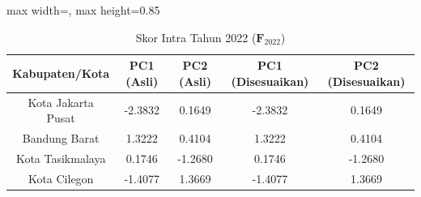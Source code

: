 \begin{table}[H]
\centering
\caption{Skor Intra Tahun 2022 ($\mathbf{F}_{2022}$)} \label{tab:sampleskor_intra_2022}
\begin{adjustbox}{max width=\textwidth, max height=0.85\textheight}
\begin{tabular}{|c|c|c|c|c|}
\hline
\textbf{Kabupaten/Kota} & \textbf{PC1 (Asli)} & \textbf{PC2 (Asli)} & \textbf{PC1 (Disesuaikan)} & \textbf{PC2 (Disesuaikan)} \\
\hline
Kota Jakarta Pusat & -2.3832 & 0.1649 & -2.3832 & 0.1649 \\
Bandung Barat & 1.3222 & 0.4104 & 1.3222 & 0.4104 \\
Kota Tasikmalaya & 0.1746 & -1.2680 & 0.1746 & -1.2680 \\
Kota Cilegon & -1.4077 & 1.3669 & -1.4077 & 1.3669 \\
\hline
\end{tabular}
\end{adjustbox}
\end{table}